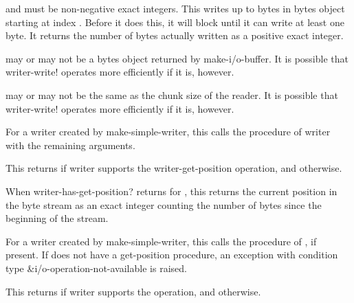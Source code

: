 \begin{entry}{%
}
   
 and  must be non-negative exact integers.
This writes up to  bytes in bytes object 
starting at index . Before it does this, it will block
until it can write at least one byte. It returns the number of bytes
actually written as a positive exact integer.
   
 may or may not be a bytes object returned by {\cf
  make-i/o-buffer}. It is possible that {\cf writer-write!} operates
more efficiently if it is, however.

 may or may not be the same as the chunk size of the reader. It is
possible that {\cf writer-write!} operates more efficiently if it is, however.

For a writer created by {\cf make-simple-writer}, this calls the
 procedure of writer with the remaining arguments.
\end{entry}   

\begin{entry}{%
}
   
This returns \schtrue{} if writer supports the {\cf
  writer-get-position} operation, and \schfalse{} otherwise.
\end{entry}   

\begin{entry}{%
}
   
When {\cf writer-has-get-position?} returns \schtrue{} for
, this returns the current position in the byte stream as
an exact integer counting the number of bytes since the beginning of
the stream.
  
For a writer created by {\cf make-simple-writer}, this calls the
 procedure of , if present. If 
does not have a get-position procedure, an exception with condition
type {\cf\&i/o-operation-not-available} is raised.
\end{entry}

\begin{entry}{%
}
   
This returns \schtrue{} if writer supports the  operation, and
\schfalse{} otherwise.
\end{entry}


